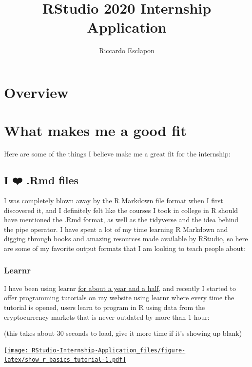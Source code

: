\documentclass[
]{book}
\title{RStudio 2020 Internship Application}
\author{Riccardo Esclapon}
\date{}
\begin{document}
\maketitle

{
\setcounter{tocdepth}{1}
\tableofcontents
}
\hypertarget{overview}{%
\chapter{Overview}\label{overview}}

\hypertarget{fit}{%
\chapter{What makes me a good fit}\label{fit}}

Here are some of the things I believe make me a great fit for the internship:

\hypertarget{i-uxfe0f-.rmd-files}{%
\section{I ❤️ .Rmd files}\label{i-uxfe0f-.rmd-files}}

I was completely blown away by the R Markdown file format when I first discovered it, and I definitely felt like the courses I took in college in R should have mentioned the .Rmd format, as well as the tidyverse and the idea behind the pipe operator. I have spent a lot of my time learning R Markdown and digging through books and amazing resources made available by RStudio, so here are some of my favorite output formats that I am looking to teach people about:

\hypertarget{learnr}{%
\subsection{Learnr}\label{learnr}}

I have been using learnr \href{https://github.com/ries9112/R-Tutorial}{for about a year and a half}, and recently I started to offer programming tutorials on my website using learnr where every time the tutorial is opened, users learn to program in R using data from the cryptocurrency markets that is never outdated by more than 1 hour:

(this takes about 30 seconds to load, give it more time if it's showing up blank)

\href{https://predictcrypto.shinyapps.io/R_Basics/}{\texttt{[image: RStudio-Internship-Application\_files/figure-latex/show\_r\_basics\_tutorial-1.pdf]}}
\end{document}
